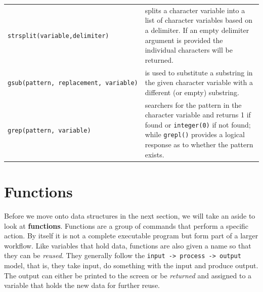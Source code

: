\documentclass[a4paper]{book}
\begin{document}
\begin{longtable}[]{@{}ll@{}}
\begin{minipage}[t]{0.21\columnwidth}\raggedright\strut
\texttt{strsplit(variable,delimiter)}\strut
\end{minipage} & \begin{minipage}[t]{0.73\columnwidth}\raggedright\strut
splits a character variable into a list of character variables based on
a delimiter. If an empty delimiter argument is provided the individual
characters will be returned.\strut
\end{minipage}\tabularnewline
\begin{minipage}[t]{0.21\columnwidth}\raggedright\strut
\texttt{gsub(pattern,\ replacement,\ variable)}\strut
\end{minipage} & \begin{minipage}[t]{0.73\columnwidth}\raggedright\strut
is used to substitute a substring in the given character variable with a
different (or empty) substring.\strut
\end{minipage}\tabularnewline
\begin{minipage}[t]{0.21\columnwidth}\raggedright\strut
\texttt{grep(pattern,\ variable)}\strut
\end{minipage} & \begin{minipage}[t]{0.73\columnwidth}\raggedright\strut
searchers for the pattern in the character variable and returns 1 if
found or \texttt{integer(0)} if not found; while \texttt{grepl()}
provides a logical response as to whether the pattern exists.\strut
\end{minipage}\tabularnewline
\bottomrule
\end{longtable}

\section{Functions}\label{functions}

Before we move onto data structures in the next section, we will take an
aside to look at \textbf{functions}. Functions are a group of commands
that perform a specific action. By itself it is not a complete
executable program but form part of a larger workflow. Like variables
that hold data, functions are also given a name so that they can be
\emph{reused}. They generally follow the
\texttt{input\ -\textgreater{}\ process\ -\textgreater{}\ output} model,
that is, they take input, do something with the input and produce
output. The output can either be printed to the screen or be
\emph{returned} and assigned to a variable that holds the new data for
further reuse.
\end{document}

